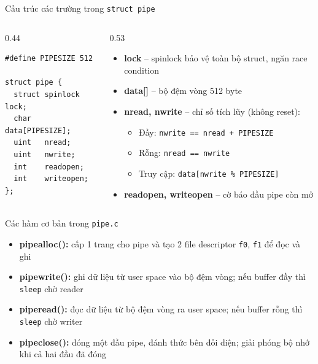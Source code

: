\documentclass[aspectratio=169]{beamer}
\begin{document}
\begin{frame}[fragile]{Cấu trúc các trường trong \texttt{struct pipe}}
    \begin{columns}[c]
        \begin{column}{0.44\textwidth}
            \begin{lstlisting}
#define PIPESIZE 512

struct pipe {
  struct spinlock lock;
  char   data[PIPESIZE];
  uint   nread;
  uint   nwrite;
  int    readopen;
  int    writeopen;
};
            \end{lstlisting}
        \end{column}
        \begin{column}{0.53\textwidth}
            \begin{itemize}\setlength\itemsep{6pt}
                \item \textbf{lock} -- spinlock bảo vệ toàn bộ struct, ngăn race condition
                \item \textbf{data[]} -- bộ đệm vòng 512 byte
                \item \textbf{nread, nwrite} -- chỉ số tích lũy (không reset):
                    \begin{itemize}\setlength\itemsep{2pt}
                        \item Đầy: \texttt{nwrite == nread + PIPESIZE}
                        \item Rỗng: \texttt{nread == nwrite}
                        \item Truy cập: \texttt{data[nwrite \% PIPESIZE]}
                    \end{itemize}
                \item \textbf{readopen, writeopen} -- cờ báo đầu pipe còn mở
            \end{itemize}
        \end{column}
    \end{columns}
\end{frame}

\begin{frame}{Các hàm cơ bản trong \texttt{pipe.c}}
    \begin{itemize}\setlength\itemsep{10pt}
        \item \textbf{pipealloc():} cấp 1 trang cho pipe và tạo 2 file descriptor \texttt{f0}, \texttt{f1} để đọc và ghi
        \item \textbf{pipewrite():} ghi dữ liệu từ user space vào bộ đệm vòng; nếu buffer đầy thì \texttt{sleep} chờ reader
        \item \textbf{piperead():} đọc dữ liệu từ bộ đệm vòng ra user space; nếu buffer rỗng thì \texttt{sleep} chờ writer
        \item \textbf{pipeclose():} đóng một đầu pipe, đánh thức bên đối diện; giải phóng bộ nhớ khi cả hai đầu đã đóng
    \end{itemize}
\end{frame}
\end{document}
